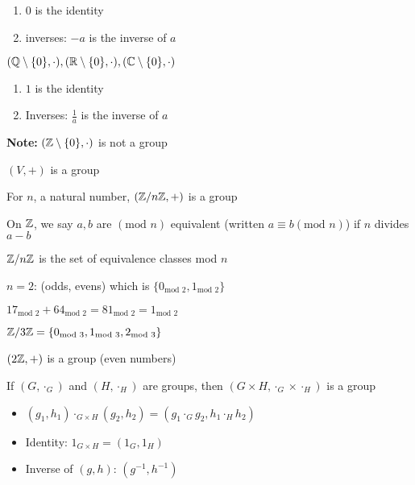 \begin{enumerate}
  \item $0$ is the identity
  \item inverses: $-a$ is the inverse of $a$
\end{enumerate}

\begin{example}
  $(\mathbb Q \setminus \{0\}, \cdot), (\mathbb R \setminus \{0\}, \cdot), (\mathbb C \setminus \{0\}, \cdot)$ 
\end{example}

\begin{enumerate}
  \item $1$ is the identity
  \item Inverses: $\frac{1}{a}$ is the inverse of $a$
\end{enumerate}

\textbf{Note:} $(\mathbb Z \setminus \{0\}, \cdot)$ is not a group

$(V, +)$ is a group

\begin{example}
  For $n$, a natural number, $(\mathbb Z/n\mathbb Z, +)$ is a group
\end{example}

On $\mathbb Z$, we say $a, b$ are $(\text{mod } n)$ equivalent (written $a \equiv b (\text{mod } n)$) 
if $n$ divides $a-b$

$\mathbb Z/n\mathbb Z$ is the set of equivalence classes mod $n$

\begin{example}
  $n = 2$: (odds, evens) which is $\{0_{\text{mod } 2}, 1_{\text{mod } 2}\}$
\end{example}

$17_{\text{mod } 2} + 64_{\text{mod } 2} = 81_{\text{mod } 2} = 1_{\text{mod } 2}$

\begin{example}
  $\mathbb Z/3\mathbb Z = \{0_{\text{mod } 3}, 1_{\text{mod } 3}, 2_{\text{mod } 3}\}$
\end{example}

\begin{example}
  $(2\mathbb Z, +)$ is a group (even numbers)
\end{example}

\begin{example}
  If $(G, \cdot_G)$ and $(H, \cdot_H)$ are groups, then $(G \times H, \cdot_{G} \times \cdot_H)$ is a group
\end{example}

\begin{itemize}
  \item $(g_1, h_1) \cdot_{G \times H} (g_2, h_2) = (g_1 \cdot_G g_2, h_1 \cdot_H h_2)$
  \item Identity: $1_{G \times H} = (1_G, 1_H)$
  \item Inverse of $(g, h)$: $(g^{-1}, h^{-1})$ 
\end{itemize}

